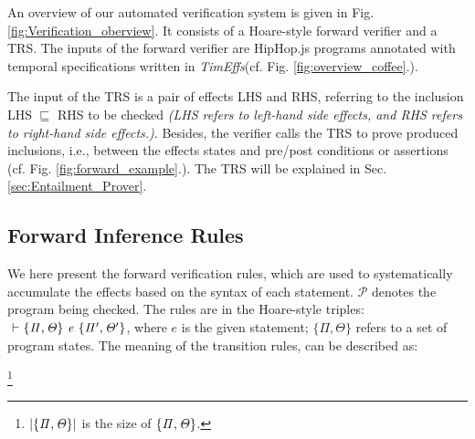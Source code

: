 \documentclass[acmsmall,10pt,review]{acmart}
\newcommand{\wbigcup}{\mathop{\widetilde{\bigcup}}\displaylimits}
\newcommand{\env}{\code{\mathcal{V}}}
\newcommand{\es}{\theta}
\newcommand{\timedEffects}{\emph{TimEffs}}
\newcommand{\code}[1]{{\tt{\ensuremath{\m{#1}}}}}
\newcommand{\CONTAIN}{\sqsubseteq}
\newcommand{\m}{\mathit}
\newcommand\figref[1]{Fig. \textcolor{black}{\ref{#1}}.}
\newcommand\secref[1]{Sec. \textcolor{black}{\ref{#1}}}
\begin{document}
{An overview of our automated verification system is given in \figref{fig:Verification_oberview} It consists of a Hoare-style forward verifier and a TRS. 
The inputs of the forward verifier are HipHop.js programs annotated with temporal specifications written in \timedEffects (cf. \figref{fig:overview_coffee}). 

The input of the TRS is a pair of effects LHS and RHS, referring to the inclusion LHS \code{\CONTAIN} RHS to be checked 
\textit{(LHS refers to left-hand side effects, and RHS refers to right-hand side effects.)}. Besides, the verifier calls the TRS to prove produced inclusions, i.e., between the effects states and pre/post conditions or assertions (cf. \figref{fig:forward_example}). The TRS will be explained in \secref{sec:Entailment_Prover}. 

\newcommand{\s}[1]{\code{\{ #1\}}}





 

\subsection{Forward Inference Rules}
\label{Forward_Rules}



 We here present the forward verification rules, 
which are used to systematically accumulate the effects based on 
the syntax of each statement.
\code{\mathcal{P}} denotes the program being checked. 
The rules are in the Hoare-style triples: 
\code{\ \vdash \s{ \Pi, \Theta } \ e\ 
\s{\Pi^\prime, \Theta^\prime}},  where 
$e$ is the given statement;
\s{ \Pi, \Theta } refers to a set of program states. 
The meaning of the transition rules, can be described as: 




\vspace{2mm}
\qquad\qquad\quad \code{\s{ \Pi^\prime, \Theta^\prime } = 
\wbigcup_{i{=}0}^{|\s{ \Pi, \Theta }| \text{-} 1}  
\s{\pi_i^\prime, \es_i^\prime} \ \ where\ \ 
 \vdash  \s{\pi_i, \es_i} \ e \ \s{\pi_i^\prime, \es_i^\prime}.} 
\footnote{\code{|\s{ \Pi, \Theta }|} is the 
size of \code{\s{ \Pi, \Theta }}.}
\vspace{3mm}


}
\end{document}
